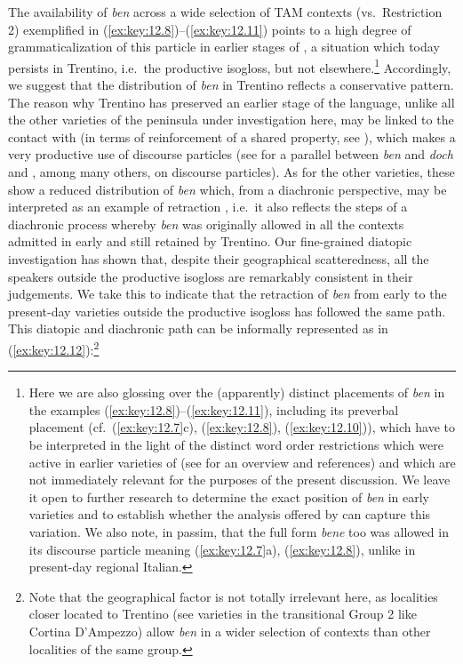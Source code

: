 \documentclass[output=paper]{langsci/langscibook}
\begin{document}
The availability of \emph{ben} across a wide selection of \gls{TAM} contexts
(vs.\ Restriction 2) exemplified in (\ref{ex:key:12.8})--(\ref{ex:key:12.11}) points to a high degree of
grammaticalization of this particle in earlier stages of , a
situation which today persists in Trentino, i.e.\ the productive isogloss, but
not elsewhere.\footnote{Here we are also glossing over the (apparently)
    distinct placements of \emph{ben} in the examples (\ref{ex:key:12.8})--(\ref{ex:key:12.11}), including its
    preverbal placement (cf.\ (\ref{ex:key:12.7}c), (\ref{ex:key:12.8}), (\ref{ex:key:12.10})), which have to be interpreted in
    the light of the distinct word order restrictions which were active in
    earlier varieties of  (see \citealt{Ledgeway2012} for an
    overview and references) and which are not immediately relevant for the
    purposes of the present discussion. We leave it open to further research to
    determine the exact position of \emph{ben} in early  varieties
    and to establish whether the analysis offered by
    \textcite{CognSchi2018b,CognSchi2018} can capture this variation. We also
    note, in passim, that the full form \emph{bene} too was allowed in its
    discourse particle meaning (\ref{ex:key:12.7}a), (\ref{ex:key:12.8}), unlike in present-day regional
Italian.} Accordingly, we suggest that the distribution of \emph{ben} in
Trentino reflects a conservative pattern. The reason why Trentino has preserved
an earlier stage of the language, unlike all the other varieties of the 
peninsula under investigation here, may be linked to the contact with 
(in terms of reinforcement of a shared property, see \citealt{Beninca1994,%
Cordin2011,Cognola2014}), which makes a very productive use of discourse
particles (see \citealt{CognSchi2018} for a parallel between  \emph{ben}
and  \emph{doch} and \citealt{Weydt1969}, among many others, on 
discourse particles). As for the other varieties, these show a reduced
distribution of \emph{ben} which, from a diachronic perspective, may be
interpreted as an example of retraction \citep{Norde2011}, i.e.\ it also
reflects the steps of a diachronic process whereby \emph{ben} was originally
allowed in all the contexts admitted in early  and still retained
by Trentino. Our fine-grained diatopic investigation has shown that, despite
their geographical scatteredness, all the speakers outside the productive
isogloss are remarkably consistent in their judgements. We take this to
indicate that the retraction of \emph{ben} from early  to the
present-day varieties outside the productive isogloss has followed the same
path. This diatopic and diachronic path can be informally represented as in
(\ref{ex:key:12.12}):\footnote{Note that the geographical factor is not totally irrelevant
    here, as localities closer located to Trentino (see varieties in the
transitional Group 2 like Cortina D’Ampezzo) allow \emph{ben} in a wider
selection of contexts than other localities of the same group.}
\end{document}

